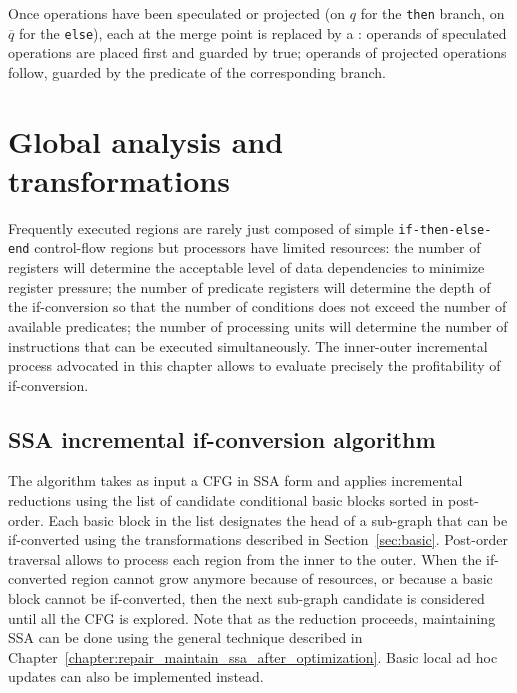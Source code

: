 Once operations have been speculated or projected (on $q$ for the \texttt{then} branch, on $\overline{q}$ for the \texttt{else}), each \phifuns at the merge point is replaced by a \psifun: 
operands of speculated operations are placed first and guarded by true; 
operands of projected operations follow, guarded by the predicate of the corresponding branch.

\section{Global analysis and transformations}
\label{sec:if_conversion:hyperblock}
Frequently executed regions are rarely just composed of simple \texttt{if-then-else-end} control-flow regions but processors have limited resources: 
the number of registers will determine the acceptable level of data dependencies to minimize register pressure; 
the number of predicate registers will determine the depth of the if-conversion so that the number of conditions does not exceed the number of available predicates; 
the number of processing units will determine the number of instructions that can be executed simultaneously. 
The inner-outer incremental process advocated in this chapter allows to evaluate precisely the profitability of if-conversion.

\subsection{SSA incremental if-conversion algorithm}


The algorithm takes as input a CFG in SSA form and applies incremental reductions using the list of candidate conditional basic blocks sorted in post-order. 
Each basic block in the list designates the head of a sub-graph that can be if-converted using the transformations described in Section~\ref{sec:basic}. 
Post-order traversal allows to process each region from the inner to the outer. 
When the if-converted region cannot grow anymore because of resources, or because a basic block cannot be if-converted, then the next sub-graph candidate is considered until all the CFG is explored.
%
%
Note that as the reduction proceeds, maintaining SSA can be done using the general technique described in Chapter~\ref{chapter:repair_maintain_ssa_after_optimization}. 
Basic local ad hoc updates can also be implemented instead.


